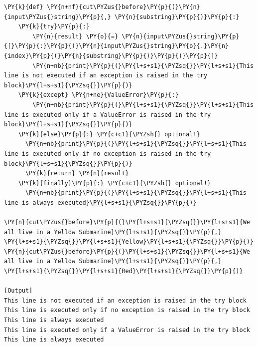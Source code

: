 \begin{Verbatim}[label=\makebox{\url{https://github.com/lucabaldini/cmepda/tree/master/slides/latex/snippets/exceptions.py}},commandchars=\\\{\}]
\PY{k}{def} \PY{n+nf}{cut\PYZus{}before}\PY{p}{(}\PY{n}{input\PYZus{}string}\PY{p}{,} \PY{n}{substring}\PY{p}{)}\PY{p}{:}
    \PY{k}{try}\PY{p}{:}
        \PY{n}{result} \PY{o}{=} \PY{n}{input\PYZus{}string}\PY{p}{[}\PY{p}{:}\PY{p}{(}\PY{n}{input\PYZus{}string}\PY{o}{.}\PY{n}{index}\PY{p}{(}\PY{n}{substring}\PY{p}{)}\PY{p}{)}\PY{p}{]}
        \PY{n+nb}{print}\PY{p}{(}\PY{l+s+s1}{\PYZsq{}}\PY{l+s+s1}{This line is not executed if an exception is raised in the try block}\PY{l+s+s1}{\PYZsq{}}\PY{p}{)}
    \PY{k}{except} \PY{n+ne}{ValueError}\PY{p}{:}
        \PY{n+nb}{print}\PY{p}{(}\PY{l+s+s1}{\PYZsq{}}\PY{l+s+s1}{This line is executed only if a ValueError is raised in the try block}\PY{l+s+s1}{\PYZsq{}}\PY{p}{)}
    \PY{k}{else}\PY{p}{:} \PY{c+c1}{\PYZsh{} optional!}
      \PY{n+nb}{print}\PY{p}{(}\PY{l+s+s1}{\PYZsq{}}\PY{l+s+s1}{This line is executed only if no exception is raised in the try block}\PY{l+s+s1}{\PYZsq{}}\PY{p}{)}
      \PY{k}{return} \PY{n}{result}
    \PY{k}{finally}\PY{p}{:} \PY{c+c1}{\PYZsh{} optional!}
      \PY{n+nb}{print}\PY{p}{(}\PY{l+s+s1}{\PYZsq{}}\PY{l+s+s1}{This line is always executed}\PY{l+s+s1}{\PYZsq{}}\PY{p}{)}

\PY{n}{cut\PYZus{}before}\PY{p}{(}\PY{l+s+s1}{\PYZsq{}}\PY{l+s+s1}{We all live in a Yellow Submarine}\PY{l+s+s1}{\PYZsq{}}\PY{p}{,} \PY{l+s+s1}{\PYZsq{}}\PY{l+s+s1}{Yellow}\PY{l+s+s1}{\PYZsq{}}\PY{p}{)}
\PY{n}{cut\PYZus{}before}\PY{p}{(}\PY{l+s+s1}{\PYZsq{}}\PY{l+s+s1}{We all live in a Yellow Submarine}\PY{l+s+s1}{\PYZsq{}}\PY{p}{,} \PY{l+s+s1}{\PYZsq{}}\PY{l+s+s1}{Red}\PY{l+s+s1}{\PYZsq{}}\PY{p}{)}

[Output]
This line is not executed if an exception is raised in the try block
This line is executed only if no exception is raised in the try block
This line is always executed
This line is executed only if a ValueError is raised in the try block
This line is always executed
\end{Verbatim}